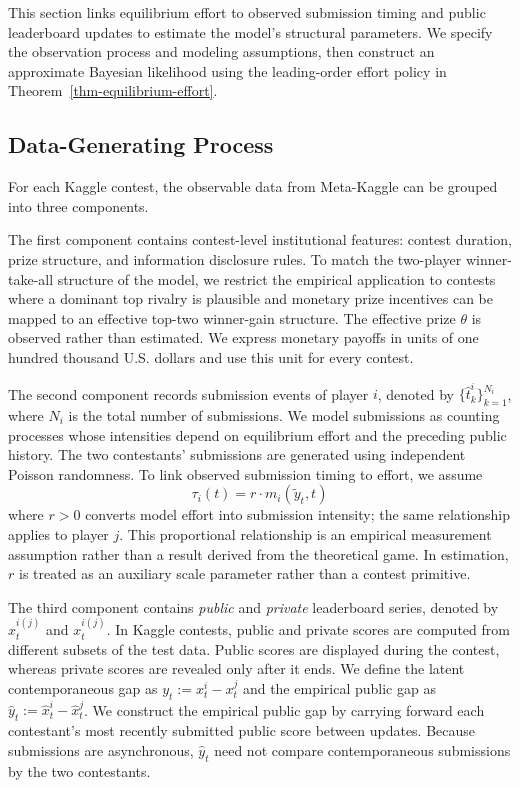 \documentclass[mnsc]{informs3}
\begin{document}
This section links equilibrium effort to observed submission timing and public leaderboard updates to estimate the model's structural parameters. We specify the observation process and modeling assumptions, then construct an approximate Bayesian likelihood using the leading-order effort policy in Theorem~\ref{thm-equilibrium-effort}.

\subsection{Data-Generating Process}

For each Kaggle contest, the observable data from Meta-Kaggle can be grouped into three components.

The first component contains contest-level institutional features: contest duration, prize structure, and information disclosure rules.
To match the two-player winner-take-all structure of the model, we restrict the empirical application to contests where a dominant top rivalry is plausible and monetary prize incentives can be mapped to an effective top-two winner-gain structure.
The effective prize $\theta$ is observed rather than estimated. We express monetary payoffs in units of one hundred thousand U.S. dollars and use this unit for every contest.

The second component records submission events of player $i$, denoted by $\{\hat{t}^i_k\}_{k=1}^{N_i}$, where $N_i$ is the total number of submissions.
We model submissions as counting processes whose intensities depend on equilibrium effort and the preceding public history. The two contestants' submissions are generated using independent Poisson randomness. To link observed submission timing to effort, we assume
\begin{equation}\label{eq-model-intensity}
{\tau_i(t) = r \cdot m_i(\tilde{y}_t,t)}
\end{equation}
where \(r>0\) converts model effort into submission intensity; the same relationship applies to player \(j\). This proportional relationship is an empirical measurement assumption rather than a result derived from the theoretical game. In estimation, \(r\) is treated as an auxiliary scale parameter rather than a contest primitive.


The third component contains \textit{public} and \textit{private} leaderboard series, denoted by $\hat{x}^{i(j)}_t$ and $x^{i(j)}_t$.
In Kaggle contests, public and private scores are computed from different subsets of the test data. Public scores are displayed during the contest, whereas private scores are revealed only after it ends.
We define the latent contemporaneous gap as $y_t:=x_t^i-x_t^j$ and the empirical public gap as $\hat y_t:=\hat x_t^i-\hat x_t^j$. We construct the empirical public gap by carrying forward each contestant's most recently submitted public score between updates. Because submissions are asynchronous, $\hat y_t$ need not compare contemporaneous submissions by the two contestants.
\end{document}
